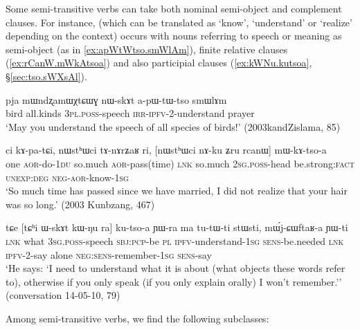 Some semi-transitive verbs can take both nominal semi-object and complement clauses. For instance,  (which can be translated as `know', `understand' or `realize' depending on the context) occurs with nouns referring to speech or meaning as semi-object (as in \ref{ex:apWtWtso.smWlAm}), finite relative clauses (\ref{ex:rCanW.mWkAtsoa}) and also participial clauses (\ref{ex:kWNu.kutsoa}, §\ref{sec:tso.sWXsAl}).

\begin{exe}
\ex \label{ex:apWtWtso.smWlAm}
\gll pja mɯndʐamɯχtɕɯɣ nɯ-skɤt a-pɯ-tɯ-tso smɯlɤm\\
bird all.kinds \textsc{3pl}.\textsc{poss}-speech \textsc{irr}-\textsc{ipfv}-2-understand prayer\\
\glt `May you understand the speech of all species of birds!' (2003kandZislama, 85)
\end{exe}

\begin{exe}
\ex   \label{ex:rCanW.mWkAtsoa}
 \gll ci kɤ-pa-tɕi, nɯstʰɯci tɤ-nɤrʑaʁ ri, [nɯstʰɯci nɤ-ku ʑru rcanɯ] mɯ-kɤ-tso-a \\
 one \textsc{aor}-do-\textsc{1du} so.much \textsc{aor}-pass(time) \textsc{lnk} so.much \textsc{2sg}.\textsc{poss}-head be.strong:\textsc{fact} \textsc{unexp}:\textsc{deg} \textsc{neg}-\textsc{aor}-know-\textsc{1sg} \\
\glt `So much time has passed since we have married, I did not realize that your hair was so long.' (2003 Kunbzang, 467)
\end{exe}

\begin{exe}
\ex   \label{ex:kWNu.kutsoa}
 \gll  tɕe [tɕʰi ɯ-skɤt kɯ-ŋu ra] ku-tso-a ɲɯ-ra ma tu-tɯ-ti stɯsti, mɯ́j-ɕɯftaʁ-a ɲɯ-ti \\
\textsc{lnk} what \textsc{3sg}.\textsc{poss}-speech \textsc{sbj}:\textsc{pcp}-be \textsc{pl} \textsc{ipfv}-understand-\textsc{1sg} \textsc{sens}-be.needed \textsc{lnk} \textsc{ipfv}-2-say alone \textsc{neg}:\textsc{sens}-remember-\textsc{1sg} \textsc{sens}-say \\
 \glt `He says: `I need to understand what it is about (what objects these words refer to), otherwise if you only speak (if you only explain orally) I won't remember.'' (conversation 14-05-10, 79)
\end{exe}
Among semi-transitive verbs, we find the following subclasses:

